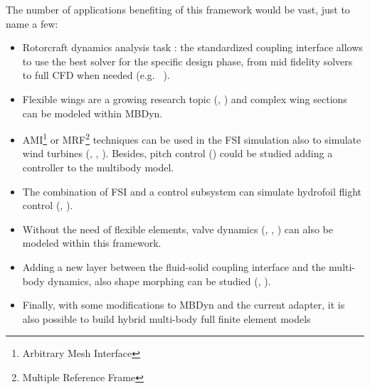 The number of applications benefiting of this framework would be vast, just to name a few:

\begin{itemize}
    \item Rotorcraft dynamics analysis task \cite{quaranta2004toward}: the standardized coupling interface allows to use the best solver for the specific design phase, from mid fidelity solvers \cite{cocco2020simulation} to full CFD when needed (e.g.\ \cite{cavagna2009simulation}  \cite{masarati2011coupled}).
    \item Flexible wings are a growing research topic (\cite{pusch2019aeroelastic}, \cite{waitman2020h}) and complex wing sections can be modeled within MBDyn.
    \item AMI\footnote{Arbitrary Mesh Interface} or MRF\footnote{Multiple Reference Frame} techniques can be used in the FSI simulation also to simulate wind turbines (\cite{guerri2008fluid}, \cite{rasheed2014comprehensive}, \cite{roul2020fluid}). Besides, pitch control (\cite{baburajan2017pitch}) could be studied adding a controller to the multibody model.
    \item The combination of FSI and a control subsystem can simulate hydrofoil flight control (\cite{lupu2018absolute}, \cite{bousquet2017control}).
    \item Without the need of flexible elements, valve dynamics (\cite{amirante2006flow}, \cite{lisowski2013three}, \cite{frosina2017modeling}) can also be modeled within this framework.
    \item Adding a new layer between the fluid-solid coupling interface and the multi-body dynamics, also shape morphing can be studied (\cite{chanzy2018analysis}, \cite{li2018review}).
    \item Finally, with some modifications to MBDyn and the current adapter, it is also possible to build hybrid multi-body full finite element models \cite{cumnuantip2018assessment}
\end{itemize}
